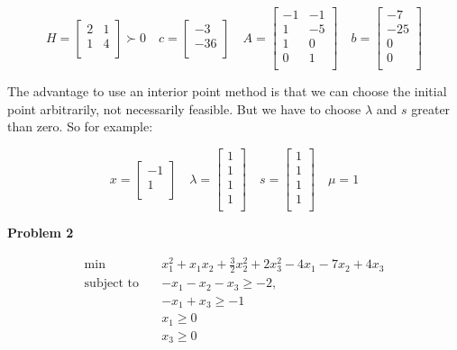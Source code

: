 \documentclass{article}
\begin{document}
\begin{equation*}
H=
 \begin{bmatrix}
2 & 1 \\
1 & 4\\
\end{bmatrix} \succ 0
\quad c=
 \begin{bmatrix}
-3 \\
-36\\
\end{bmatrix} 
\quad A=
 \begin{bmatrix}
-1 & -1 \\
 1 & -5\\
 1 & 0\\
 0 & 1\\
\end{bmatrix} 
\quad b=
 \begin{bmatrix}
-7 \\
-25\\
 0\\
 0 \\
\end{bmatrix}
\end{equation*}

The advantage to use an interior point method is that we can choose the initial point arbitrarily, not necessarily feasible. But we have to choose $\lambda$ and $s$ greater than zero. So for example:

\begin{equation*}
x=
 \begin{bmatrix}
-1\\
1\\
\end{bmatrix} 
\quad \lambda=
 \begin{bmatrix}
 1 \\
 1\\
 1\\
 1\\
\end{bmatrix} 
\quad s=
 \begin{bmatrix}
 1 \\
 1\\
 1\\
 1\\
\end{bmatrix} 
\quad \mu=1
\end{equation*}



\textbf{Problem 2}

\begin{equation*} 
\begin{aligned}
\textrm{min} \quad        & x_1^2+x_1 x_2+\frac{3}{2}x_2^2+2x_3^2-4x_1-7x_2+4x_3 \\
\textrm{subject to} \quad & -x_1-x_2-x_3\geq -2,  \\
                          & -x_1+x_3\ge -1\\
                          & x_1 \ge 0\\
                          & x_3 \ge 0\\
\end{aligned}
\end{equation*}
\end{document}
